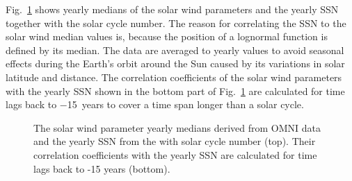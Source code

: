 Fig.~\ref{fig:OMNI_yearly_ssn_correlation_c_plot} shows yearly medians of the solar wind parameters and the yearly SSN together with the solar cycle number. The reason for correlating the SSN to the solar wind median values is, because the position of a lognormal function is defined by its median. The data are averaged to yearly values to avoid seasonal effects during the Earth’s orbit around the Sun caused by its variations in solar latitude and distance. The correlation coefficients of the solar wind parameters with the yearly SSN shown in the bottom part of Fig.~\ref{fig:OMNI_yearly_ssn_correlation_c_plot} are calculated for time lags back to \num{-15}~years to cover a time span longer than a solar cycle.
\begin{figure}
	\caption{The solar wind parameter yearly medians derived from OMNI data and the yearly SSN from the \citet{sidc} with solar cycle number (top). Their correlation coefficients with the yearly SSN are calculated for time lags back to -15 years (bottom).}
	\label{fig:OMNI_yearly_ssn_correlation_c_plot}
\end{figure}

